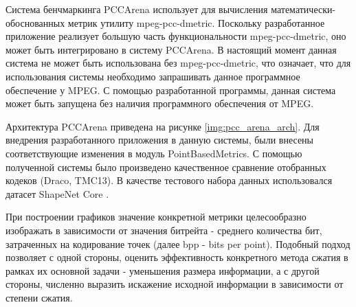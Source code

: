 Система бенчмаркинга PCCArena использует для вычисления
математически-обоснованных метрик утилиту mpeg-pcc-dmetric. Поскольку
разработанное приложение реализует большую часть функциональности
mpeg-pcc-dmetric, оно может быть интегрировано в систему PCCArena. В настоящий
момент данная система не может быть использована без mpeg-pcc-dmetric, что
означает, что для использования системы необходимо запрашивать данное
программное обеспечение у MPEG. С помощью разработанной программы, данная
система может быть запущена без наличия программного обеспечения от MPEG.


Архитектура PCCArena приведена на рисунке \ref{img:pcc_arena_arch}. Для
внедрения разработанного приложения в данную системы, были внесены
соответствующие изменения в модуль PointBasedMetrics. С помощью полученной
системы было произведено качественное сравнение отобранных кодеков (Draco,
TMC13). В качестве тестового набора данных использовался датасет ShapeNet Core
\cite{shapenet2015}.

При построении графиков значение конкретной метрики целесообразно изображать в
зависимости от значения битрейта - среднего количества бит, затраченных на
кодирование точек (далее bpp - bits per point). Подобный подход позволяет с
одной стороны, оценить эффективность конкретного метода сжатия в рамках их
основной задачи - уменьшения размера информации, а с другой стороны, численно
выразить искажение исходной информации в зависимости от степени сжатия.

